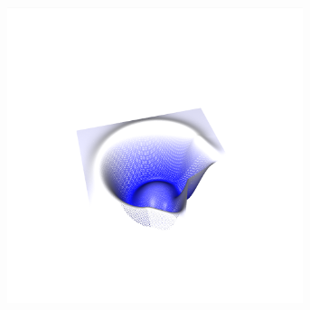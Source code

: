 \documentclass[crop=false,10pt,ngerman]{standalone}
\begin{document}
\begin{figure}[h]
\begin{subfigure}[b]{0.24\textwidth}
          \caption{}
        \end{subfigure}
        \begin{subfigure}[b]{0.24\textwidth}
          \center
          \includegraphics[trim={4cm 1.2cm 4.5cm 1.5cm},clip,width=0.95\textwidth]{images/test_wave_3.png}
          \caption{}
        \end{subfigure}


\end{figure}
\end{document}
